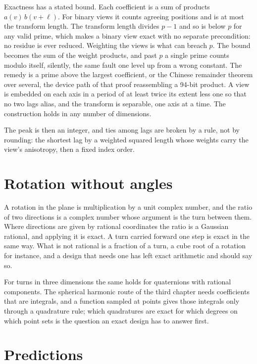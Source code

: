 Exactness has a stated bound. Each coefficient is a sum of products \(a(v)\, b(v + \ell)\). For binary
views it counts agreeing positions and is at most the transform length. The transform length divides
\(p - 1\) and so is below \(p\) for any valid prime, which makes a binary view exact with no separate
precondition: no residue is ever reduced. Weighting the views is what can breach \(p\). The bound becomes
the sum of the weight products, and past \(p\) a single prime counts modulo itself, silently, the same
fault one level up from a wrong constant. The remedy is a prime above the largest coefficient, or the
Chinese remainder theorem over several, the device path of that proof reassembling a 94-bit product. A
view is embedded on each axis in a period of at least twice its extent less one so that no two lags
alias, and the transform is separable, one axis at a time. The construction holds in any number of
dimensions.

The peak is then an integer, and ties among lags are broken by a rule, not by rounding: the shortest
lag by a weighted squared length whose weights carry the view's anisotropy, then a fixed index order.

\section{Rotation without angles}

A rotation in the plane is multiplication by a unit complex number, and the ratio of two directions
is a complex number whose argument is the turn between them. Where directions are given by rational
coordinates the ratio is a Gaussian rational, and applying it is exact. A turn carried forward one
step is exact in the same way. What is not rational is a fraction of a turn, a cube root of a
rotation for instance, and a design that needs one has left exact arithmetic and should say so.

For turns in three dimensions the same holds for quaternions with rational components. The spherical
harmonic route of the third chapter needs coefficients that are integrals, and a function sampled at
points gives those integrals only through a quadrature rule; which quadratures are exact for which
degrees on which point sets is the question an exact design has to answer first.

\section{Predictions}

